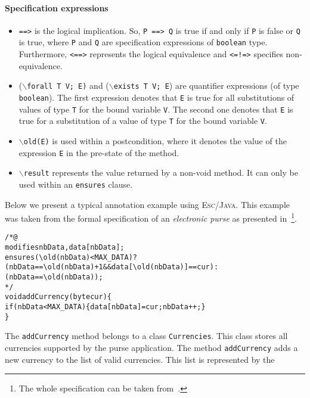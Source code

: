 \documentclass[a4paper]{llncs}
\newcommand{\escj}{\textsc{Esc/Java}}
\begin{document}
\paragraph{\bf Specification expressions} 
\begin{itemize} 
\item{\texttt{==>}} is the logical implication. So, \texttt{P 
==> Q} is true if and only if \texttt{P} is false or \texttt{Q} is 
true, where \texttt{P} and \texttt{Q} are specification expressions of  
\texttt{boolean} type. Furthermore, \texttt{<==>} represents the logical
equivalence and \texttt{<=!=>} specifies non-equivalence. 
 
\item {($\backslash$\texttt{forall T V; E)} and 
($\backslash$\texttt{exists T V; E})} are quantifier expressions (of 
type \texttt{boolean}).  The first expression denotes that \texttt{E}
is true
for all substitutions of values of type \texttt{T} for the bound 
variable \texttt{V}. The second one denotes that \texttt{E} is true 
for a substitution of a value of type \texttt{T} for the bound 
variable \texttt{V}. 
 
\item{\texttt{$\backslash$old(E)}} is used within a postcondition,
where it denotes the value of the expression \texttt{E} in the
pre-state of the method.
 
\item {\tt$\backslash$result} represents the value returned by 
a non-void method. It can only be used within an
\texttt{ensures} clause.
\end{itemize}
Below we present a typical annotation example using 
\escj. This example was taken from the formal specification of an
\emph{electronic purse} as presented in~\cite{CatanoH02a}\footnote{The whole
specification can be taken
from~\cite{CatanoH01URL}.}. 
\begin{alltt}
/*@
  modifies nbData, data[nbData];
  ensures (\verb!\!old(nbData) < MAX_DATA) ?
      (nbData == \verb!\!old(nbData) + 1 && data[\verb!\!old(nbData)] == cur) :
      (nbData == \verb!\!old(nbData));
*/
void addCurrency(byte cur)\verb!{!
   if(nbData < MAX_DATA)\verb!{!data[nbData] = cur; nbData++;\verb!}!
\verb!}!
\end{alltt}
The \texttt{addCurrency} method belongs
to a class \texttt{Currencies}. This class stores all currencies 
supported by the purse application. The method 
\texttt{addCurrency} adds a new currency to the list of valid 
currencies. This list is represented by the 
\end{document}
